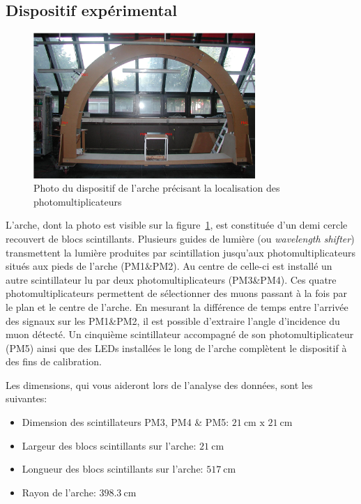 \subsection{Dispositif expérimental}

\begin{figure}
\begin{center}
    \includegraphics[width=0.75\textwidth]{figures/dispositif_arche.png}
\end{center}
\caption{Photo du dispositif de l'arche précisant la localisation des photomultiplicateurs}
\label{fig:dispositif_arche}
\end{figure}

L'arche, dont la photo est visible sur la figure~\ref{fig:dispositif_arche}, est constituée d'un demi cercle recouvert de blocs scintillants.
Plusieurs guides de lumière (ou \textit{wavelength shifter}) transmettent la lumière produites par scintillation jusqu'aux photomultiplicateurs situés aux pieds de l'arche (PM1\&PM2).
Au centre de celle-ci est installé un autre scintillateur lu par deux photomultiplicateurs (PM3\&PM4).
Ces quatre photomultiplicateurs permettent de sélectionner des muons passant à la fois par le plan et le centre de l'arche.
En mesurant la différence de temps entre l'arrivée des signaux sur les PM1\&PM2, il est possible d'extraire l'angle d'incidence du muon détecté.
Un cinquième scintillateur accompagné de son photomultiplicateur (PM5) ainsi que des LEDs installées le long de l'arche complètent le dispositif à des fins de calibration.

\bigskip

Les dimensions, qui vous aideront lors de l'analyse des données, sont les suivantes:

\begin{itemize}
    \item Dimension des scintillateurs PM3, PM4 \& PM5: \(\SI{21}{\cm}\textrm{ x }\SI{21}{\cm}\)
    \item Largeur des blocs scintillants sur l'arche: \(\SI{21}{\cm}\)
    \item Longueur des blocs scintillants sur l'arche: \(\SI{517}{\cm}\)
    \item Rayon de l'arche: \(\SI{398.3}{\cm}\)
\end{itemize}

